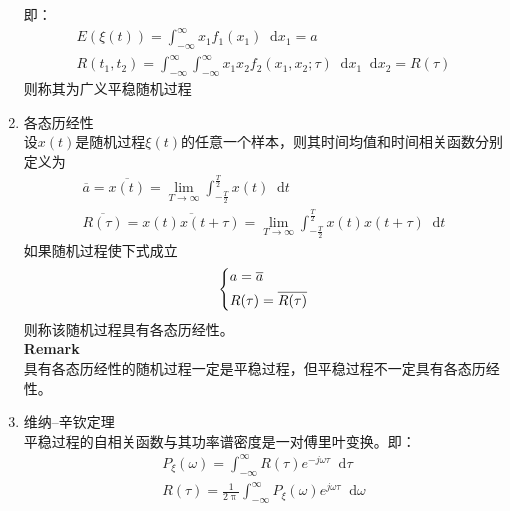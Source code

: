 \documentclass[UTF8]{ctexrep}
\newcommand{\dif}{\mathop{}\!{}\mathrm{d}}
\def\pth#1{\left( {#1}\right)}
\renewcommand{\rem}{{\bfseries Remark}}
\begin{document}
\begin{enumerate}
即：
\begin{gather*}
E\pth{\xi(t)}=\int_{-\infty}^{\infty}x_1f_1(x_1)\dif x_1=a\\
R(t_1, t_2)=\int_{-\infty}^{\infty}\int_{-\infty}^{\infty}x_1x_2f_2(x_1, x_2;\tau)\dif x_1\dif x_2=R(\tau)
\end{gather*}
则称其为广义平稳随机过程
\item 各态历经性\\
设$x(t)$是随机过程$\xi(t)$的任意一个样本，则其时间均值和时间相关函数分别定义为
\begin{gather*}
\overline{a}=\overline{x(t)}=\lim_{T\to\infty}\int_{-\frac{T}{2}}^{\frac{T}{2}}x(t)\dif t\\
\overline{R(\tau)}=\overline{x(t)x(t+\tau)}=\lim_{T\to\infty}\int_{-\frac{T}{2}}^{\frac{T}{2}}x(t)x(t+\tau)\dif t
\end{gather*}
如果随机过程使下式成立
\[\begin{dcases}a=\overline{a}\\R(\tau)=\overline{R(\tau)}\end{dcases}\]
则称该随机过程具有各态历经性。\\
\rem\\
具有各态历经性的随机过程一定是平稳过程，但平稳过程不一定具有各态历经性。
\item 维纳--辛钦定理\\
平稳过程的自相关函数与其功率谱密度是一对傅里叶变换。即：
\begin{gather*}
P_{\xi}\pth{\omega} =\int_{-\infty}^{\infty}R\pth{\tau}e^{-j\omega \tau}\dif \tau\\
R\pth{\tau}=\frac{1}{2\uppi}\int_{-\infty}^{\infty}P_{\xi}\pth{\omega}e^{j\omega \tau}\dif\omega
\end{gather*}


\end{enumerate}
\end{document}
